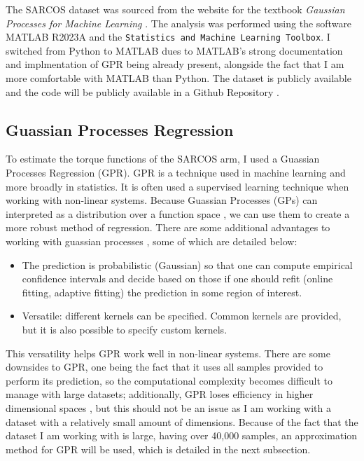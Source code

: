 \documentclass{article}
\begin{document}
    The SARCOS dataset was sourced from the website for the textbook 
    \textit{Gaussian Processes for Machine Learning} \citet{sarcos}. The analysis was performed
    using the software MATLAB R2023A and the \texttt{Statistics and Machine Learning Toolbox}. I
    switched from Python to MATLAB dues to MATLAB's strong documentation and implmentation of
    GPR being already present, alongside the fact that I am more comfortable with MATLAB than
    Python. The dataset is publicly available and the code will be publicly available in a Github
    Repository \citep{github}.
    
    \subsection{Guassian Processes Regression}
    
    To estimate the torque functions of the SARCOS arm, I used a Guassian Processes Regression
    (GPR). GPR is a technique used in machine learning and more broadly in statistics. It is often
    used a supervised learning technique when working with non-linear systems. Because
    Guassian Processes (GPs) can interpreted as a distribution over a function space \citep{gpml},
    we can use them to create a more robust method of regression. There are some additional
    advantages to working with guassian processes \citep{scikit-gp}, some of which are detailed
    below:
    
    \begin{itemize}
        \item The prediction is probabilistic (Gaussian) so that one can compute empirical confidence intervals and decide based on those if one should refit (online fitting, adaptive fitting) the prediction in some region of interest.
        \item Versatile: different kernels can be specified. Common kernels are provided, but it is also possible to specify custom kernels.
    \end{itemize}
    
    This versatility helps GPR work well in non-linear systems. There are some downsides to GPR,
    one being the fact that it uses all samples provided to perform its prediction, so the
    computational complexity becomes difficult to manage with large datasets; additionally, GPR
    loses efficiency in higher dimensional spaces \citep{scikit-gp}, but this should not be an
    issue as I am working with a dataset with a relatively small amount of dimensions. Because of
    the fact that the dataset I am working with is large, having over 40,000 samples, an
    approximation method for GPR will be used, which is detailed in the next subsection.
    
\end{document}
